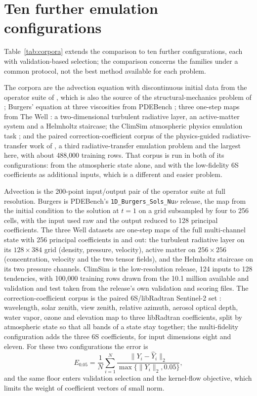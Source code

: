 \section{Ten further emulation configurations}\label{sec:corpora}

Table~\ref{tab:corpora} extends the comparison to ten further configurations, each with
validation-based selection; the comparison concerns the families under a common protocol, not the
best method available for each problem.

The corpora are the advection equation with discontinuous initial data from the operator suite
of \cite{dehoop}, which is also the source of the structural-mechanics problem of \cite{nmkc};
Burgers' equation at three viscosities from PDEBench \cite{pdebench}; three one-step maps from
The Well \cite{thewell}: a two-dimensional turbulent radiative layer, an active-matter system and
a Helmholtz staircase; the ClimSim atmospheric physics emulation task \cite{climsim}; and the
paired correction-coefficient corpus of the physics-guided radiative-transfer work of \cite{pkan},
a third radiative-transfer emulation problem and the largest here, with about 488{,}000 training
rows. That corpus
is run in both of its configurations: from the atmospheric state alone, and with the low-fidelity
6S coefficients as additional inputs, which is a different and easier problem.

Advection is the 200-point input/output pair of the operator suite at full resolution. Burgers is
PDEBench's \texttt{1D\_Burgers\_Sols\_Nu}$\nu$ release, the map from the initial condition to the
solution at $t = 1$ on a grid subsampled by four to 256 cells, with the input used raw and the output
reduced to 128 principal coefficients. The three Well datasets are one-step maps of the full
multi-channel state with 256 principal coefficients in and out: the turbulent radiative layer on
its $128 \times 384$ grid (density, pressure, velocity), active matter on $256 \times 256$
(concentration, velocity and the two tensor fields), and the Helmholtz staircase on its two pressure
channels. ClimSim is the low-resolution release, 124 inputs to 128 tendencies, with 100{,}000
training rows drawn from the 10.1 million available and validation and test taken from the release's
own validation and scoring files. The correction-coefficient corpus is the paired 6S/libRadtran
Sentinel-2 set \cite{vermote,mayer}: wavelength, solar zenith, view zenith, relative azimuth,
aerosol optical depth, water vapor, ozone and elevation map to three libRadtran coefficients, split
by atmospheric state so that all bands of a state stay together; the multi-fidelity configuration
adds the three 6S coefficients, for input dimensions eight and eleven. For these two configurations
the error is
\begin{equation}\label{eq:coefficient-floor}
 E_{0.05}=\frac{1}{N}\sum_{i=1}^{N}
 \frac{\|Y_i-\widehat Y_i\|_2}{\max\{\|Y_i\|_2,0.05\}},
\end{equation}
and the same floor enters validation selection and the kernel-flow objective, which limits the
weight of coefficient vectors of small norm.

